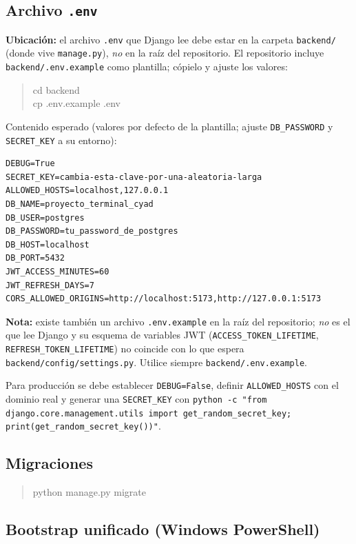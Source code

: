 \documentclass{computacion}
\begin{document}
\subsection{Archivo \texttt{.env}}

\textbf{Ubicación:} el archivo \texttt{.env} que Django lee debe estar en la carpeta \texttt{backend/} (donde vive \texttt{manage.py}), \emph{no} en la raíz del repositorio. El repositorio incluye \texttt{backend/.env.example} como plantilla; cópielo y ajuste los valores:

\begin{quote}
\ttfamily
cd backend \\
cp .env.example .env
\end{quote}

Contenido esperado (valores por defecto de la plantilla; ajuste \texttt{DB\_PASSWORD} y \texttt{SECRET\_KEY} a su entorno):

\begin{Verbatim}[fontsize=\small, frame=single]
DEBUG=True
SECRET_KEY=cambia-esta-clave-por-una-aleatoria-larga
ALLOWED_HOSTS=localhost,127.0.0.1
DB_NAME=proyecto_terminal_cyad
DB_USER=postgres
DB_PASSWORD=tu_password_de_postgres
DB_HOST=localhost
DB_PORT=5432
JWT_ACCESS_MINUTES=60
JWT_REFRESH_DAYS=7
CORS_ALLOWED_ORIGINS=http://localhost:5173,http://127.0.0.1:5173
\end{Verbatim}

\textbf{Nota:} existe también un archivo \texttt{.env.example} en la raíz del repositorio; \emph{no} es el que lee Django y su esquema de variables JWT (\texttt{ACCESS\_TOKEN\_LIFETIME}, \texttt{REFRESH\_TOKEN\_LIFETIME}) no coincide con lo que espera \texttt{backend/config/settings.py}. Utilice siempre \texttt{backend/.env.example}.

Para producción se debe establecer \texttt{DEBUG=False}, definir \texttt{ALLOWED\_HOSTS} con el dominio real y generar una \texttt{SECRET\_KEY} con \texttt{python -c "from django.core.management.utils import get\_random\_secret\_key; print(get\_random\_secret\_key())"}.

\subsection{Migraciones}

\begin{quote}
\ttfamily
python manage.py migrate
\end{quote}

\subsection{Bootstrap unificado (Windows PowerShell)}
\end{document}
